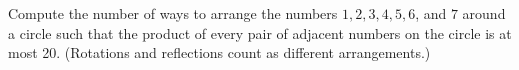 Compute the number of ways to arrange the numbers $1,2,3,4,5,6$, and $7$ around a circle such that the product of every pair of adjacent numbers on the circle is at most 20. (Rotations and reflections count as different arrangements.)